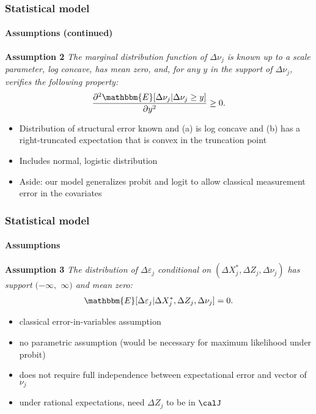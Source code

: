 
\begin{frame}
\frametitle{Statistical model} \framesubtitle{Assumptions (continued)}

\textbf{Assumption 2} \textit{The marginal distribution function of $%
\Delta\nu_{j}$ is known up to a scale parameter, log concave, has mean zero,
and, for any $y$ in the support of $\Delta\nu_{j}$, verifies the following
property: 
\begin{align*}
\frac{\partial^{2}\mathbbm{E}[\Delta\nu_{j}|\Delta\nu_{j}\geq y]}{\partial
y^{2}}\geq 0.
\end{align*}%
} \pause

\begin{itemize}
\item Distribution of structural error known and (a) is log concave and (b)
has a right-truncated expectation that is convex in the truncation point

\item Includes normal, logistic distribution

\item Aside: our model generalizes probit and logit to allow classical
measurement error in the covariates
\end{itemize}
\end{frame}


\begin{frame}
\frametitle{Statistical model} \framesubtitle{Assumptions}

\textbf{Assumption 3} \textit{The distribution of $\Delta\varepsilon_{j}$
conditional on $(\Delta X^{*}_{j},\Delta Z_{j},\Delta \nu_{j})$ has support $%
(-\infty,$ $\infty)$ and mean zero: 
\begin{align*}
\mathbbm{E}[\Delta\varepsilon_{j}|\Delta X^{*}_{j},\Delta
Z_{j},\Delta\nu_{j}]=0.
\end{align*}%
} \pause

\begin{itemize}
\item classical error-in-variables assumption

\item no parametric assumption (would be necessary for maximum likelihood
under probit)

\item does not require full independence between expectational error and
vector of $\nu_{j}$

\item under rational expectations, need $\Delta Z_{j}$ to be in $\calJ$
\end{itemize}
\end{frame}

